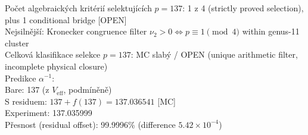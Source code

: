 \documentclass[12pt,a4paper]{article}
\begin{document}
\begin{statusbox}
Počet algebraických kritérií selektujících $p=137$: 1 z 4 (strictly proved selection),
plus 1 conditional bridge [OPEN]\\
Nejsilnější: Kronecker congruence filter $\nu_2>0 \iff p\equiv1\pmod4$ within genus-11 cluster\\
Celková klasifikace selekce $p=137$: MC slabý / OPEN (unique arithmetic filter, incomplete physical closure)\\
Predikce $\alpha^{-1}$:\\
\quad Bare: 137 (z $V_{\mathrm{eff}}$, podmíněně)\\
\quad S residuem: $137+f(137)=137.036541$ [MC]\\
\quad Experiment: 137.035999\\
\quad Přesnost (residual offset): 99.9996\% (difference $5.42\times10^{-4}$)
\end{statusbox}

\ifdefined\INCLUDEMODE
\else
  
\end{document}
